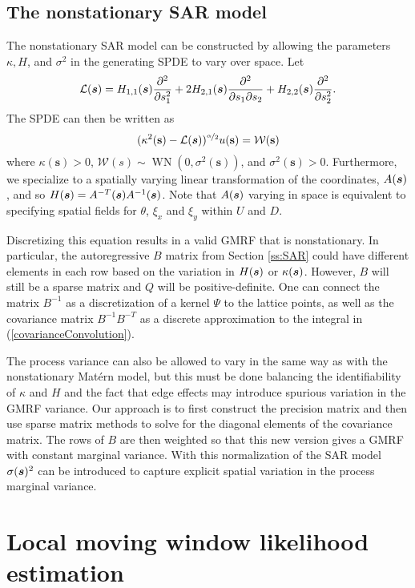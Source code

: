 \documentclass[review]{elsarticle}
\begin{document}
\subsection{The nonstationary SAR model}

The nonstationary SAR model can be constructed by allowing the parameters $\kappa, H$, and $\sigma^2$ in the generating SPDE to vary over space. 
Let
 \[
  {\cal{L}}(\mbox{\boldmath $s$}) = H_{1,1}(\mbox{\boldmath $s$}) \frac{\partial^2}{\partial s_1^2} +  2 H_{2,1}(\mbox{\boldmath $s$})\frac{\partial^2}{\partial s_1 \partial s_2} + H_{2,2}(\mbox{\boldmath $s$}) \frac{\partial^2}{\partial s_2^2}.
\]
The SPDE can then be written as
$$ (\kappa^2(\mathbf s) - {\cal{L}}(\mbox{\boldmath $s$}) )^{\nicefrac{\alpha}{2}} u(\mathbf s) = \mathcal{W}(\mathbf s) $$
where $\kappa(\mathbf s) > 0$, $\mathcal{W}(s) \sim \operatorname{WN}(0, \sigma^2(\mathbf s))$, and $\sigma^2(\mathbf s) > 0$.  Furthermore, we specialize to a spatially varying linear transformation of the coordinates, $A(\mbox{\boldmath $s$})$, and so  $H(\mbox{\boldmath $s$}) = A^{-T} (\mbox{\boldmath $s$}) A^{-1}(\mbox{\boldmath $s$})$. Note that $A(\mbox{\boldmath $s$})$ varying in space is equivalent to specifying spatial fields for $\theta$, $\xi_x$ and $\xi_y$ within $U$ and $D$. 

Discretizing this equation results in a valid GMRF that is nonstationary. In particular, the autoregressive $B$ matrix from Section \ref{ss:SAR} could have  different elements in each row based on the variation in $H(\mbox{\boldmath $s$})$ or $\kappa(\mbox{\boldmath $s$})$. However, $B$ will still be a sparse matrix and $Q$ will be positive-definite. One can connect the matrix $B^{-1} $ as a discretization of a kernel $\Psi$ to the lattice points, as well as the covariance matrix $B^{-1}B^{-T}$ as a discrete approximation to the integral in (\ref{covarianceConvolution}). 

The process variance can also be allowed to vary in the same way as with the nonstationary Mat\'ern model, but this must be done balancing the identifiability of $\kappa$ and $H$ and the fact that edge effects may introduce spurious variation in the  GMRF variance. Our approach is to first construct the precision matrix and then use sparse matrix methods to solve for the diagonal elements of the covariance matrix. The rows of $B$ are then weighted so that  this new version gives a GMRF with constant marginal variance. With this normalization of the SAR model $\sigma(\mbox{\boldmath $s$})^2$ can be introduced to capture explicit spatial variation in the process marginal variance. 

\section{Local moving window likelihood estimation}
\end{document}
